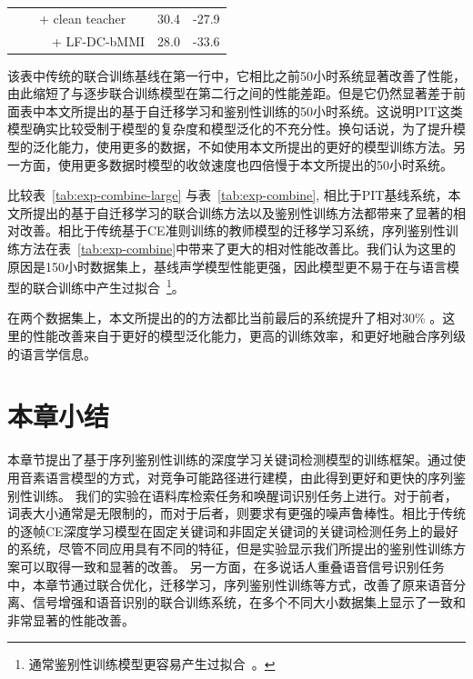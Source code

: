 \begin{table}[thbp!]
{\begin{tabular}{ c m{}||c c}
        &\ \ + clean teacher& 30.4& -27.9 \\
        &\ \ \ \ + LF-DC-bMMI& 28.0 & -33.6 \\ 
      \hline
    \end{tabular}
  }
\end{table}

该表中传统的联合训练基线在第一行中，它相比之前50小时系统显著改善了性能，由此缩短了与逐步联合训练模型在第二行之间的性能差距。但是它仍然显著差于前面表中本文所提出的基于自迁移学习和鉴别性训练的50小时系统。这说明PIT这类模型确实比较受制于模型的复杂度和模型泛化的不充分性。换句话说，为了提升模型的泛化能力，使用更多的数据，不如使用本文所提出的更好的模型训练方法。另一方面，使用更多数据时模型的收敛速度也四倍慢于本文所提出的50小时系统。

比较表~\ref{tab:exp-combine-large} 与表~\ref{tab:exp-combine},  相比于PIT基线系统，本文所提出的基于自迁移学习的联合训练方法以及鉴别性训练方法都带来了显著的相对改善。相比于传统基于CE准则训练的教师模型的迁移学习系统，序列鉴别性训练方法在表~\ref{tab:exp-combine}中带来了更大的相对性能改善比。我们认为这里的原因是150小时数据集上，基线声学模型性能更强，因此模型更不易于在与语言模型的联合训练中产生过拟合~\footnote{通常鉴别性训练模型更容易产生过拟合~\cite{povey2016purely}。}。

在两个数据集上，本文所提出的的方法都比当前最后的系统提升了相对30\% 。这里的性能改善来自于更好的模型泛化能力，更高的训练效率，和更好地融合序列级的语言学信息。




\section{本章小结}
\label{chap:kws-sum}

本章节提出了基于序列鉴别性训练的深度学习关键词检测模型的训练框架。通过使用音素语言模型的方式，对竞争可能路径进行建模，由此得到更好和更快的序列鉴别性训练。
我们的实验在语料库检索任务和唤醒词识别任务上进行。对于前者，词表大小通常是无限制的，而对于后者，则要求有更强的噪声鲁棒性。相比于传统的逐帧CE深度学习模型在固定关键词和非固定关键词的关键词检测任务上的最好的系统，尽管不同应用具有不同的特征，但是实验显示我们所提出的鉴别性训练方案可以取得一致和显著的改善。
%
另一方面，在多说话人重叠语音信号识别任务中，本章节通过联合优化，迁移学习，序列鉴别性训练等方式，改善了原来语音分离、信号增强和语音识别的联合训练系统，在多个不同大小数据集上显示了一致和非常显著的性能改善。
